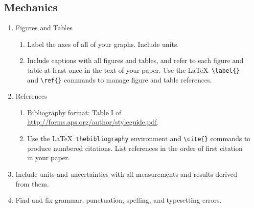 \documentclass[11 pt]{article}
\begin{document}
\subsection*{Mechanics}
\begin{enumerate}
\item Figures and Tables
  \begin{enumerate}
  \item Label the axes of all of your graphs. Include units.
    
  \item Include captions with all figures and tables, and refer to
    each figure and table at least once in the text of your
    paper. Use the \LaTeX\ \verb+\label{}+ and \verb+\ref{}+
    commands to manage figure and table references.

  \end{enumerate}

\item References 
  \begin{enumerate}
  \item Bibliography format: Table I of 
    \url{http://forms.aps.org/author/styleguide.pdf}.
    
  \item Use the \LaTeX\ \verb+thebibliography+ environment and
    \verb+\cite{}+ commands to produce numbered citations. List
    references in the order of first citation in your paper.
  \end{enumerate}

\item Include units and uncertainties with all measurements and
  results derived from them.

\item Find and fix grammar, punctuation, spelling, and typesetting
  errors.

\end{enumerate}
\end{document}
